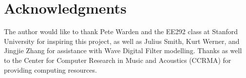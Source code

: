 \documentclass[twoside,a4paper]{article}
\begin{document}
\section{Acknowledgments}
%
The author would like to thank Pete Warden and the EE292 class at
Stanford University for inspiring this project, as well as Julius
Smith, Kurt Werner, and Jingjie Zhang for assistance with Wave
Digital Filter modelling. Thanks as well to the Center for Computer
Research in Music and Acoustics (CCRMA) for providing computing
resources.

\nocite{*}


\end{document}
